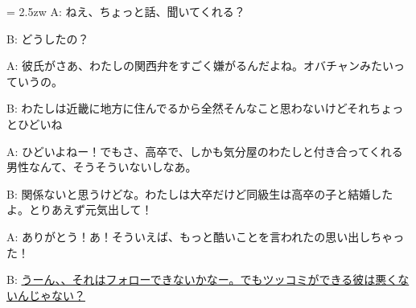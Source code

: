 \documentclass[11pt]{amsart}
\title{}
\author{}
\newenvironment{hangall}[1]{\hangindent = 2.5zw\everypar{\hangindent = 2.5zw}}{}
\begin{document}
\maketitle
\begin{hangall}{}%
A: ねえ、ちょっと話、聞いてくれる？

B: どうしたの？

A: 彼氏がさあ、わたしの関西弁をすごく嫌がるんだよね。オバチャンみたいっていうの。

B: わたしは近畿に地方に住んでるから全然そんなこと思わないけどそれちょっとひどいね

A: ひどいよねー！でもさ、高卒で、しかも気分屋のわたしと付き合ってくれる男性なんて、そうそういないしなあ。

B: 関係ないと思うけどな。わたしは大卒だけど同級生は高卒の子と結婚したよ。とりあえず元気出して！

A: ありがとう！あ！そういえば、もっと酷いことを言われたの思い出しちゃった！

B: \ul{うーん、、それはフォローできないかなー。でもツッコミができる彼は悪くないんじゃない？}\end{hangall}
\end{document}
